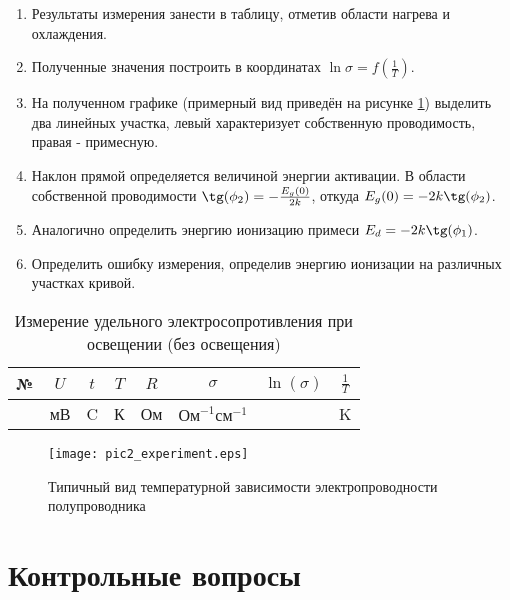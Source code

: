 \begin{enumerate}
\item Результаты измерения занести в таблицу, отметив области нагрева и охлаждения.
\item Полученные значения построить в координатах $\ln \sigma = f \left( \frac{1}{T} \right)$.
\item На полученном графике (примерный вид приведён на рисунке \ref{pic2_experiment}) выделить два линейных участка, левый характеризует собственную проводимость, правая - примесную.
\item Наклон прямой определяется величиной энергии активации. В области собственной проводимости $\tg (\phi_{2}) = -\frac{E_{g}(0)}{2 k}$, откуда $E_{g}(0) = -2 k \tg(\phi_{2})$.
\item Аналогично определить энергию ионизацию примеси $E_{d} = -2 k \tg(\phi_{1})$.\
\item Определить ошибку измерения, определив энергию ионизации на различных участках кривой.
\end{enumerate}

\begin{table}[h!]
\caption{Измерение удельного электросопротивления при освещении (без освещения)}
\begin{center}
\begin{tabular}{c|c|c|c|c|c|c|c}
№ & $U$ & $t$ & $T$ & $R$ & $\sigma$ & $\ln(\sigma)$ & $\frac{1}{T}$ \\
\hline
& мВ & \textdegree C & К & Ом & $\text{Ом}^{-1} \text{см}^{-1}$ &  & K \\
\hline
\end{tabular}
\end{center}
\end{table}

\begin{figure}[h!]\centering
\texttt{[image: pic2\_experiment.eps]}
\caption{Типичный вид температурной зависимости электропроводности полупроводника}
\label{pic2_experiment}
\end{figure}

\section{Контрольные вопросы}

